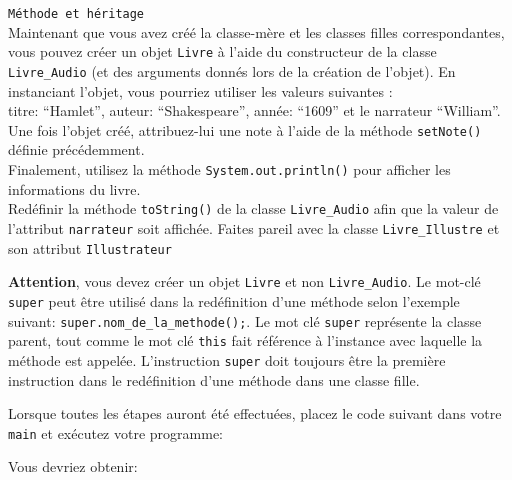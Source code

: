 \begin{Exercice}[10 minutes] \lstinline{Méthode et héritage} \\
Maintenant que vous avez créé la classe-mère et les classes filles correspondantes, vous pouvez créer un objet \lstinline{Livre} à l'aide du constructeur de la classe \lstinline{Livre_Audio} (et des arguments donnés lors de la création de l'objet).
En instanciant l'objet, vous pourriez utiliser les valeurs suivantes :\\
titre: ``Hamlet'', auteur: ``Shakespeare'', année: ``1609'' et le narrateur ``William''.\\
Une fois l'objet créé, attribuez-lui une note à l'aide de la méthode \lstinline{setNote()} définie précédemment.\\ 
Finalement, utilisez la méthode \lstinline{System.out.println()} pour afficher les informations du livre.\\
Redéfinir la méthode \lstinline{toString()} de la classe \lstinline{Livre_Audio} afin que la valeur de l'attribut \lstinline{narrateur} soit affichée.
Faites pareil avec la classe \lstinline{Livre_Illustre} et son attribut \lstinline{Illustrateur}
\begin{conseil}
\textbf{Attention}, vous devez créer un objet \lstinline{Livre} et non \lstinline{Livre_Audio}.
Le mot-clé \lstinline{super} peut être utilisé dans la redéfinition d'une méthode selon l'exemple suivant: \lstinline{super.nom_de_la_methode();}. Le mot clé \lstinline{super} représente la classe parent, tout comme le mot clé \lstinline{this} fait référence à l'instance avec laquelle la méthode est appelée. 
L'instruction \lstinline{super} doit toujours être la première instruction dans le redéfinition d'une méthode dans une classe fille. 
\end{conseil}
\begin{solution}
	
\end{solution}
\begin{solution}
	
\end{solution}
\begin{solution}
	
\end{solution}
\end{Exercice}
\newpage
Lorsque toutes les étapes auront été effectuées, placez le code suivant dans votre \lstinline{main} et exécutez votre programme:

Vous devriez obtenir:

    

